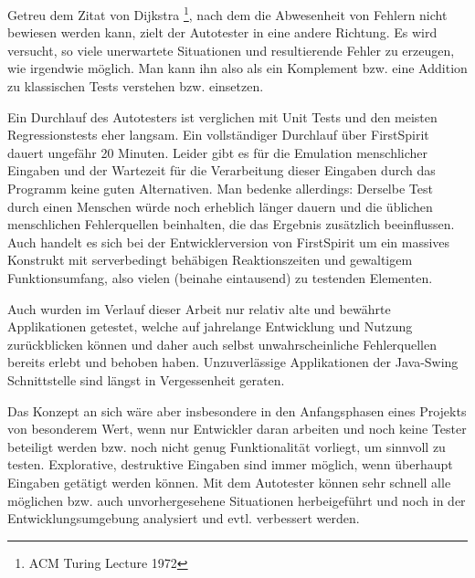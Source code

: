 Getreu dem Zitat von Dijkstra \footnote{ACM Turing Lecture 1972},
nach dem die Abwesenheit von Fehlern nicht bewiesen werden kann,
zielt der Autotester in eine andere Richtung. Es wird versucht, so viele
unerwartete Situationen und resultierende Fehler zu erzeugen, wie
irgendwie möglich. Man kann ihn also als ein Komplement bzw. eine Addition
zu klassischen Tests verstehen bzw. einsetzen.

Ein Durchlauf des Autotesters ist verglichen mit Unit Tests und den
meisten Regressionstests eher langsam. Ein vollständiger Durchlauf
über FirstSpirit dauert ungefähr 20 Minuten. Leider gibt es für die
Emulation menschlicher Eingaben und der Wartezeit für die Verarbeitung
dieser Eingaben durch das Programm keine guten Alternativen.
Man bedenke allerdings: Derselbe Test durch einen Menschen würde
noch erheblich länger dauern und die üblichen menschlichen Fehlerquellen
beinhalten, die das Ergebnis zusätzlich beeinflussen. Auch handelt es
sich bei der Entwicklerversion von FirstSpirit um ein massives
Konstrukt mit serverbedingt behäbigen Reaktionszeiten und gewaltigem
Funktionsumfang, also vielen (beinahe eintausend) zu testenden Elementen.

Auch wurden im Verlauf dieser Arbeit nur relativ alte und bewährte
Applikationen getestet, welche auf jahrelange Entwicklung und Nutzung
zurückblicken können und daher auch selbst unwahrscheinliche
Fehlerquellen bereits erlebt und behoben haben. Unzuverlässige
Applikationen der Java-Swing Schnittstelle sind längst in Vergessenheit
geraten.

Das Konzept an sich wäre aber insbesondere in den Anfangsphasen
eines Projekts von besonderem Wert, wenn nur Entwickler daran
arbeiten und noch keine Tester beteiligt werden bzw. noch nicht
genug Funktionalität vorliegt, um sinnvoll zu testen. Explorative,
destruktive Eingaben sind immer möglich, wenn überhaupt
Eingaben getätigt werden können. Mit dem Autotester können
sehr schnell alle möglichen bzw. auch unvorhergesehene Situationen herbeigeführt
und noch in der Entwicklungsumgebung analysiert und evtl.
verbessert werden.

